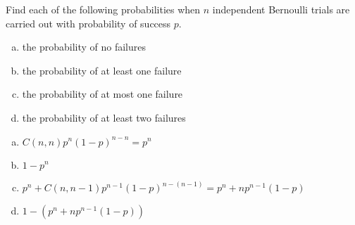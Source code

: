 \documentclass[../main.tex]{subfiles}
\begin{document}
Find each of the following probabilities when $n$ independent Bernoulli trials are carried out with probability of success $p$.
\begin{enumerate}[a)]
	\item the probability of no failures
	\item the probability of at least one failure
	\item the probability of at most one failure
	\item the probability of at least two failures
\end{enumerate}

\solution
\begin{enumerate}[a)]
	\item $C(n, n)p^n(1 - p)^{n - n} = p^n$
	\item $1 - p^n$
	\item $p^n + C(n, n - 1)p^{n - 1}(1 - p)^{n - (n - 1)} = p^n + np^{n - 1}(1 - p)$
	\item $1 - (p^n + np^{n - 1}(1 - p))$
\end{enumerate}
\end{document}

